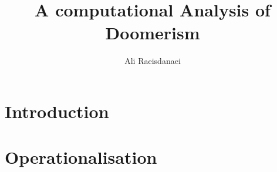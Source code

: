 \documentclass{article}
\begin{document}

\title{A computational Analysis of Doomerism}
\author{Ali Raeisdanaei}
\maketitle

\section{Introduction}


\section{Operationalisation}



\printbibliography
\end{document}
